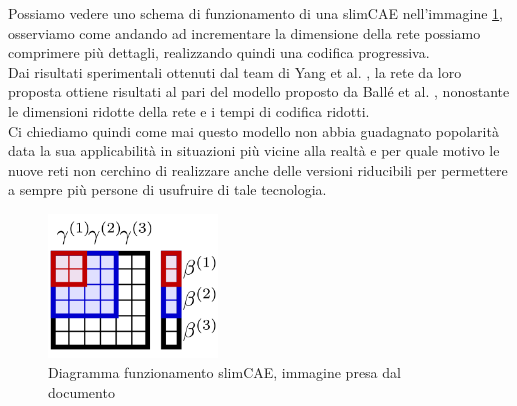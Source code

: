Possiamo vedere uno schema di funzionamento di una slimCAE nell’immagine \ref{fig:smallCAE}, osserviamo come andando ad incrementare la dimensione della rete possiamo comprimere più dettagli, realizzando quindi una codifica progressiva.\\
Dai risultati sperimentali ottenuti dal team di Yang et al. \cite{yang2021slimmable}, la rete da loro proposta ottiene risultati al pari del modello proposto da Ballé et al. \cite{minnen2018joint}, nonostante le dimensioni ridotte della rete e i tempi di codifica ridotti.\\
Ci chiediamo quindi come mai questo modello non abbia guadagnato popolarità data la sua applicabilità in situazioni più vicine alla realtà e per quale motivo le nuove reti non cerchino di realizzare anche delle versioni riducibili per permettere a sempre più persone di usufruire di tale tecnologia.\\
\begin{figure}[!h]
    \centering
    \includegraphics[width=0.4\textwidth]{Immagini/slimCAE.png}
    \caption{Diagramma funzionamento slimCAE, immagine presa dal documento \cite{yang2021slimmable}}
    \label{fig:smallCAE}
\end{figure}